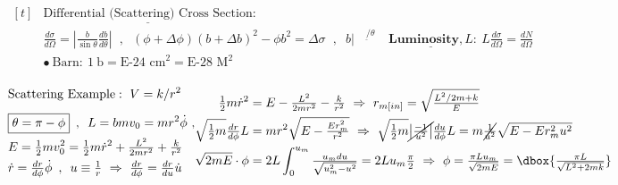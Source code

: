 \documentclass{article}
\newcommand{\dboxed}[1]{\dbox{\ensuremath{#1}}}
\begin{document}
\vspace{10pt}
\(
    \begin{aligned}[t]
        & \underline{ \text{Differential (Scattering) Cross Section} }: \\
        & \boxed{ \frac{d\sigma}{d\Omega} = \left| \frac{b}{\sin\theta} \frac{db}{d\theta} \right| }
            \hspace{7pt}, \hspace{7pt} (\phi + \Delta\phi) (b + \Delta b)^2 - \phi b^2 = \Delta \sigma
            \hspace{7pt}, \hspace{7pt} b \Big|^{ \underline{\ \ \ \ \ \ / \theta \ \ }}
            \\
        & \bullet\ \text{Barn}:\ 1\ \text{b} = \text{E-24 cm}^2 = \text{E-28 M}^2\\
    \end{aligned}
\)
\hspace{15pt}
\(
    \underline{ \textbf{Luminosity}, L }:\ \boxed{ L \frac{d\sigma}{d\Omega} = \frac{dN}{d\Omega} }
\)

\vspace{15pt}
\(
    \begin{aligned}
        & \text{Scattering Example}:\ V = {k}/{r^2}\\[5pt]
        & \boxed{ \theta = \pi - \phi }
            \hspace{5pt} , \hspace{5pt} L = bmv_0 = mr^2\dot{\phi} \ , 
            \\
        & E = \tfrac{1}{2}mv_0^2 = \tfrac{1}{2}m\dot{r}^2 + \tfrac{L^2}{2mr^2} + \tfrac{k}{r^2}\\
        & \dot{r} = \tfrac{dr}{d\phi} \dot{\phi}
            \hspace{5pt} , \hspace{5pt} u \equiv \tfrac{1}{r} \ \Rightarrow\ \tfrac{dr}{d\phi} = \tfrac{dr}{du} \dot{u}
            \\
    \end{aligned}
    \hfill
    \begin{aligned}
        \tfrac{1}{2}m \dot{r}^2 & = E - \tfrac{L^2}{2mr^2} - \tfrac{k}{r^2}
            \ \Rightarrow\ r_{m[in]} = \sqrt{ \tfrac{L^2/2m + k}{E} }
            \\
        \sqrt{ \tfrac{1}{2}m } \tfrac{dr}{d\phi} L & = mr^2 \sqrt{ E - \tfrac{Er_m^2}{r^2} }
            \ \Rightarrow\ \sqrt{ \tfrac{1}{2}m } \cancel{ \left| \tfrac{-1}{u^2} \right| } \tfrac{du}{d\phi} L 
            = m \cancel{ \tfrac{1}{u^2} } \sqrt{ E - Er_m^2u^2 }
            \\
        \sqrt{2mE} \cdot \phi & = 2 L \int_0^{u_m} \tfrac{u_m du}{\sqrt{u_m^2-u^2}}
            = 2L u_m \tfrac{\pi}{2}
            \ \Rightarrow \ \phi = \tfrac{\pi L u_m}{\sqrt{2mE}} = \dboxed{ \tfrac{\pi L}{\sqrt{L^2 + 2mk}} }
    \end{aligned}
\)
\end{document}
